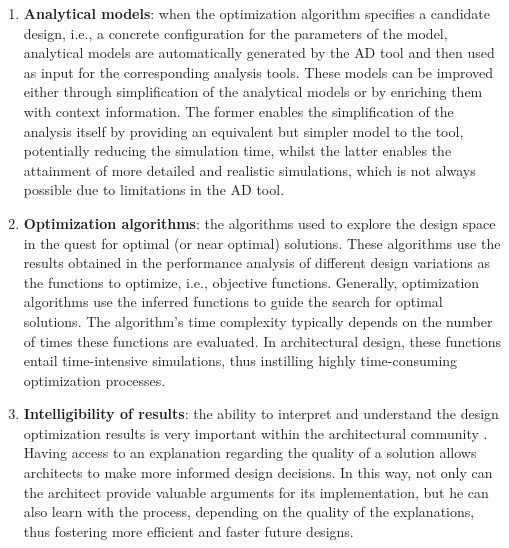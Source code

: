 \begin{enumerate}
\item \textbf{Analytical models}: when the optimization algorithm specifies a candidate design, i.e., a concrete configuration for the parameters of the model, analytical models are automatically generated by the \ac{AD} tool and then used as input for the corresponding analysis tools. These models can be improved either through simplification of the analytical models or by enriching them with context information. The former enables the simplification of the analysis itself by providing an equivalent but simpler model to the tool, potentially reducing the simulation time, whilst the latter enables the attainment of more detailed and realistic simulations, which is not always possible due to limitations in the \ac{AD} tool. 

\item \textbf{Optimization algorithms}: the algorithms used to explore the design space in the quest for optimal (or near optimal) solutions. These algorithms use the results obtained in the performance analysis of different design variations as the functions to optimize, i.e., objective functions. Generally, optimization algorithms use the inferred functions to guide the search for optimal solutions. The algorithm's time complexity typically depends on the number of times these functions are evaluated. In architectural design, these functions entail time-intensive simulations, thus instilling highly time-consuming optimization processes.

\item \textbf{Intelligibility of results}: the ability to interpret and understand the design optimization results is very important within the architectural community \cite{Shi2016,Cichocka2017SURVEY}. Having access to an explanation regarding the quality of a solution allows architects to make more informed design decisions. In this way, not only can the architect provide valuable arguments for its implementation, but he can also learn with the process, depending on the quality of the explanations, thus fostering more efficient and faster future designs. 


\end{enumerate}
